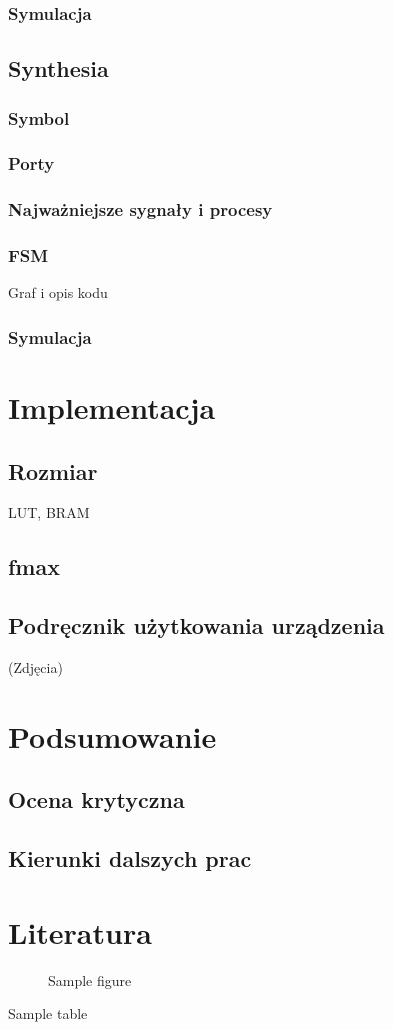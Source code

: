 \documentclass[a4paper]{report}
\begin{document}
		\subsection{Symulacja}
	\section{Synthesia}
		\subsection{Symbol}
		\subsection{Porty}
		\subsection{Najważniejsze sygnały i procesy}
		\subsection{FSM}
		Graf i opis kodu
		\subsection{Symulacja}
	
\chapter{Implementacja}
	\section{Rozmiar}
	LUT, BRAM
	\section{fmax}
	\section{Podręcznik użytkowania urządzenia}
	(Zdjęcia)
	
\chapter{Podsumowanie}
	\section{Ocena krytyczna}	
	\section{Kierunki dalszych prac}
	
\chapter{Literatura}

\begin{figure}
	\caption{Sample figure}
\end{figure}
		
\begin{table}
	\caption{Sample table}
\end{table}

\begin{appendix}
	\listoffigures
	\listoftables
\end{appendix}
\end{document}
